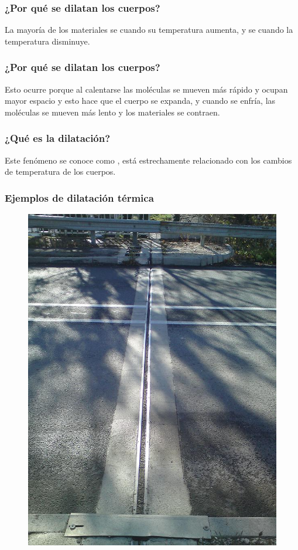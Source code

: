 \documentclass[14pt]{beamer}
\begin{document}
\begin{frame}
\frametitle{¿Por qué se dilatan los cuerpos?}
La mayoría de los materiales se  cuando su temperatura aumenta, \pause y se  cuando la temperatura disminuye.
\end{frame}
\begin{frame}
\frametitle{¿Por qué se dilatan los cuerpos?}    
Esto ocurre porque al calentarse las moléculas se mueven más rápido y ocupan mayor espacio y esto hace que el cuerpo se expanda, \pause y cuando se enfría, las moléculas se mueven más lento y los materiales se contraen.
\end{frame}
\begin{frame}
\frametitle{¿Qué es la dilatación?}    
Este fenómeno se conoce como , \pause está estrechamente relacionado con los cambios de temperatura de los cuerpos.
\end{frame}
\begin{frame}
\frametitle{Ejemplos de dilatación térmica}
\vspace*{-0.25cm}
\begin{figure}
    \centering
    \includegraphics[scale=0.25]{Imagenes/Dilatacion_01.jpg}
\end{figure}
\end{frame}
\end{document}
